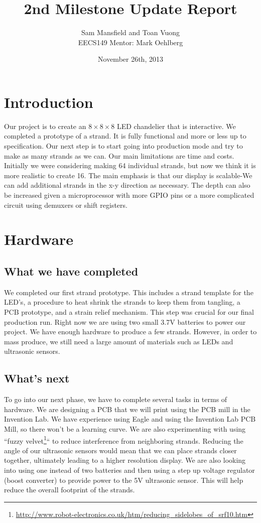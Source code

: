 \documentclass[10pt]{article}
\begin{document}
  \title{2nd Milestone Update Report}
  \author{Sam Mansfield and Toan Vuong\\
          EECS149
          Mentor: Mark Oehlberg}
  \date{November 26th, 2013}
  
  \maketitle

  \section{Introduction}
    Our project is to create an $8 \times 8 \times 8$ LED chandelier that is interactive. We completed a prototype of a strand. It is fully functional and more or less up to specification. Our next step is to start going into production mode and try to make as many strands as we can. Our main limitations are time and costs. Initially we were considering making 64 individual strands, but now we think it is more realistic to create 16. The main emphasis is that our display is scalable-We can add additional strands in the x-y direction as necessary. The depth can also be increased given a microprocessor with more GPIO pins or a more complicated circuit using demuxers or shift registers.
    
  \section{Hardware}
    \subsection{What we have completed}
      We completed our first strand prototype. This includes a strand template for the LED's, a procedure to heat shrink the strands to keep them from tangling, a PCB prototype, and a strain relief mechanism. This step was crucial for our final production run. Right now we are using two small 3.7V batteries to power our project. We have enough hardware to produce a few strands. However, in order to mass produce, we still need a large amount of materials such as LEDs and ultrasonic sensors. 
    \subsection{What's next}
      To go into our next phase, we have to complete several tasks in terms of hardware. We are designing a PCB that we will print using the PCB mill in the Invention Lab. We have experience using Eagle and using the Invention Lab PCB Mill, so there won't be a learning curve. We are also experimenting with using ``fuzzy velvet\footnote{\url{http://www.robot-electronics.co.uk/htm/reducing_sidelobes_of_srf10.htm}}`` to reduce interference from neighboring strands. Reducing the angle of our ultrasonic sensors would mean that we can place strands closer together, ultimately leading to a higher resolution display. We are also looking into using one instead of two batteries and then using a step up voltage regulator (boost converter) to provide power to the 5V ultrasonic sensor. This will help reduce the overall footprint of the strands.
\end{document}
